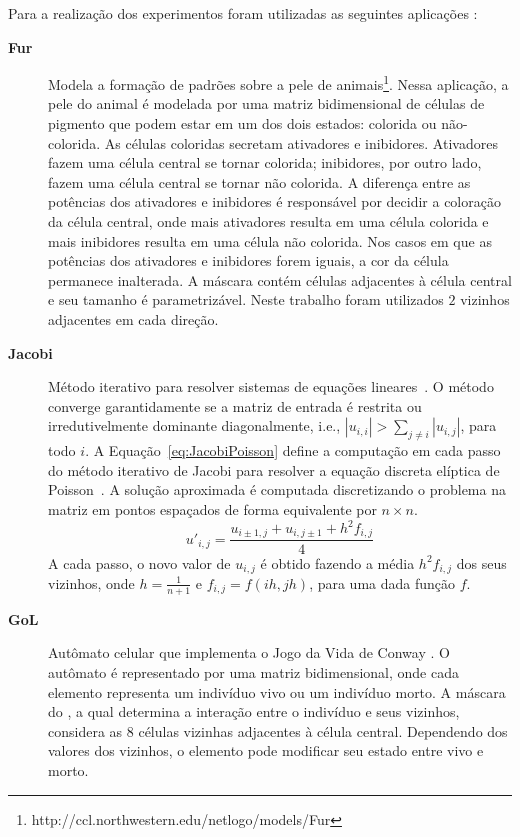 Para a realização dos experimentos foram utilizadas as seguintes aplicações \stencil:

\begin{description}
	\item[\textbf{Fur}] Modela a formação de padrões sobre a pele de animais\footnote{{http://ccl.northwestern.edu/netlogo/models/Fur}}. Nessa aplicação, a pele do animal é modelada por uma matriz bidimensional de células de pigmento que podem estar em um dos dois estados: colorida ou não-colorida. As células coloridas secretam ativadores e inibidores. Ativadores fazem uma célula central se tornar colorida; inibidores, por outro lado, fazem uma célula central se tornar não colorida.  A diferença entre as potências dos ativadores e inibidores é responsável por decidir a coloração da célula central, onde mais ativadores resulta em uma célula colorida e mais inibidores resulta em uma célula não colorida. Nos casos em que as potências dos ativadores e inibidores forem iguais, a cor da célula permanece inalterada. A máscara contém células adjacentes à célula central e seu tamanho é parametrizável. Neste trabalho foram utilizados $2$ vizinhos adjacentes em cada direção.

	\item[\textbf{Jacobi}] Método iterativo para resolver sistemas de equações lineares~\cite{demmel97}.
O método converge garantidamente se a matriz de entrada é restrita ou irredutivelmente dominante diagonalmente, i.e., $|u_{i,i}| > \sum_{j\neq i}{|u_{i,j}|}$, para todo $i$.
A Equação~\ref{eq:JacobiPoisson} define a computação em cada passo do método iterativo de Jacobi para resolver a equação discreta elíptica de Poisson~\cite{demmel97}. A solução aproximada é computada discretizando o problema na matriz em pontos espaçados de forma equivalente por $n\times n$.\\
 \begin{equation}
 u'_{i,j} = \frac{u_{i\pm1,j} + u_{i,j\pm1} + h^2f_{i,j}}{4}
 \label{eq:JacobiPoisson}
 \end{equation}
 A cada passo, o novo valor de $u_{i,j}$ é obtido fazendo a média $h^2f_{i,j}$ dos seus vizinhos, onde $h = \frac{1}{n+1}$ e $f_{i,j} = f(ih,jh)$,
 para uma dada função $f$.

	\item[\textbf{GoL}] Autômato celular que implementa o Jogo da Vida de Conway \cite{gardner70}. O autômato é representado por uma matriz bidimensional, onde cada elemento representa um indivíduo vivo ou um indivíduo morto. A máscara do \stencil, a qual determina a interação entre o indivíduo e seus vizinhos, considera as $8$ células vizinhas adjacentes à célula central. Dependendo dos valores dos vizinhos, o elemento pode modificar seu estado entre vivo e morto.\\

\end{description}


